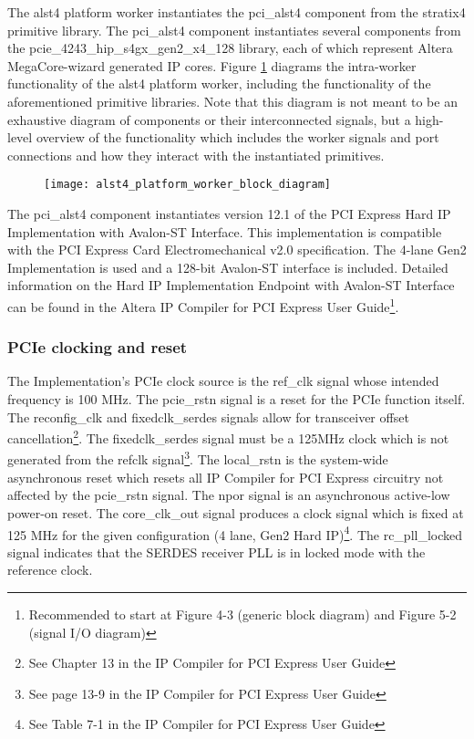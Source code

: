 \begin{flushleft}
	The alst4 platform worker instantiates the pci\_alst4 component from the stratix4 primitive library. The pci\_alst4 component instantiates several components from the pcie\_4243\_hip\_s4gx\_gen2\_x4\_128 library, each of which represent Altera MegaCore-wizard generated IP cores. Figure \ref{fig:blockdiagram} diagrams the intra-worker functionality of the alst4 platform worker, including the functionality of the aforementioned primitive libraries. Note that this diagram is not meant to be an exhaustive diagram of components or their interconnected signals, but a high-level overview of the functionality which includes the worker signals and port connections and how they interact with the instantiated primitives.

	\begin{figure}[h]
		\centering\captionsetup{type=figure}\texttt{[image: alst4\_platform\_worker\_block\_diagram]}
		\label{fig:blockdiagram}
	\end{figure}
	The pci\_alst4 component instantiates version 12.1 of the PCI Express Hard IP Implementation with Avalon-ST Interface. This implementation is compatible with the PCI Express Card Electromechanical v2.0 specification. The 4-lane Gen2 Implementation is used and a 128-bit Avalon-ST interface is included. Detailed information on the Hard IP Implementation Endpoint with Avalon-ST Interface can be found in the Altera IP Compiler for PCI Express User Guide\footnote{Recommended to start at Figure 4-3 (generic block diagram) and Figure 5-2 (signal I/O diagram)}.
	\subsubsection*{PCIe clocking and reset}
	The Implementation's PCIe clock source is the ref\_clk signal whose intended frequency is 100 MHz. The pcie\_rstn signal is a reset for the PCIe function itself. The reconfig\_clk and fixedclk\_serdes signals allow for transceiver offset cancellation\footnote{See Chapter 13 in the IP Compiler for PCI Express User Guide}. The fixedclk\_serdes signal must be a 125MHz clock which is not generated from the refclk signal\footnote{See page 13-9 in the IP Compiler for PCI Express User Guide}. The local\_rstn is the system-wide asynchronous reset which resets all IP Compiler for PCI Express circuitry not affected by the pcie\_rstn signal. The npor signal is an asynchronous active-low power-on reset. The core\_clk\_out signal produces a clock signal which is fixed at 125 MHz for the given configuration (4 lane, Gen2 Hard IP)\footnote{See Table 7-1 in the IP Compiler for PCI Express User Guide}. The rc\_pll\_locked signal indicates that the SERDES receiver PLL is in locked mode with the reference clock.

\end{flushleft}
